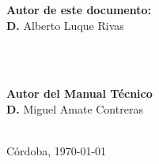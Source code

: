 \begin{titlepage}
\begin{center}
		\begin{minipage}{0.5\textwidth}
            \begin{center}
                \textbf{Autor de este documento:}\\
                \textbf{D.} Alberto Luque Rivas
            \end{center}
        \end{minipage}\\[0.5cm]
        ~
        \begin{minipage}{0.5\textwidth}
            \begin{center}
                \textbf{Autor del Manual Técnico}\\
                \textbf{D.} Miguel Amate Contreras
            \end{center}
        \end{minipage}\\
        
        \vfill\vfill\vfill\vfill
        {\large Córdoba, \today}
        
	\end{center}
\end{titlepage}